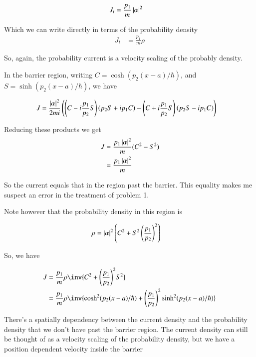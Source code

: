 \documentclass{article}
\begin{document}
\begin{align}\label{eqn:JtBarrier}
J_t
&= \frac{p_1}{m} \left\lvert{\alpha}\right\rvert^2 
\end{align}

Which we can write directly in terms of the probability density
\begin{align*}
J_t
&= \frac{p_1}{m} \rho
\end{align*}

So, again, the probability current is a velocity scaling of the probably density.

In the barrier region, writing 
$C = \cosh(p_2(x-a)/\hbar)$, and 
$S = \sinh(p_2(x-a)/\hbar)$, we have

\begin{align*}
J &= 
\frac{\left\lvert{\alpha}\right\rvert^2}{ 2 m i } 
\left(
\left(C - i \frac{p_1}{p_2}S\right)
\left(p_2 S + i p_1 C\right) 
-
\left(C + i \frac{p_1}{p_2}S\right)
\left(p_2 S - i p_1 C\right)
\right)
\end{align*}

Reducing these products we get
\begin{align*}
J 
&= 
\frac{p_1 \left\lvert{\alpha}\right\rvert^2}{m} (C^2 - S^2) \\
&= 
\frac{p_1 \left\lvert{\alpha}\right\rvert^2}{m} 
\end{align*}

So the current equals that in the region past the barrier.  This 
equality makes me suspect an error in the treatment of problem 1.

Note however
that the probability density in this region is

\begin{align*}
\rho 
&= \left\lvert{\alpha}\right\rvert^2 \left(
C^2 + S^2 \left(\frac{p_1}{p_2}\right)^2
\right)
\end{align*}

So, we have

\begin{align*}
J 
&= 
\frac{p_1}{m} \rho \inv{C^2 + {\left(\frac{p_1}{p_2}\right)}^2 S^2 } \\
&= 
\frac{p_1}{m} \rho \inv{
\cosh^2(p_2(x-a)/\hbar)
 + 
 {\left(\frac{p_1}{p_2}\right)}^2
\sinh^2(p_2(x-a)/\hbar)
 } \\
\end{align*}

There's a spatially dependency between the current density and the probability density that we don't have past the barrier region.  The current density
can still
be thought of as a velocity scaling of the probability density, but
we have a position dependent velocity inside the barrier
\end{document}

